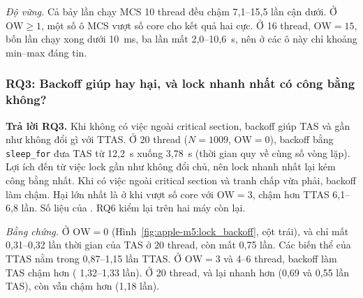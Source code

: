 \emph{Độ vững.} Cả bảy lần chạy MCS 10 thread đều chậm 7,1--15,5 lần cận dưới. Ở $\mathrm{OW} \ge 1$,
một số ô MCS vượt số core cho kết quả hai cực. Ở 16 thread, $\mathrm{OW} = 15$, bốn lần chạy xong dưới
10~ms, ba lần mất 2,0--10,6~s, nên ở các ô này chỉ khoảng min--max đáng tin.

\subsubsection{RQ3: Backoff giúp hay hại, và lock nhanh nhất có công bằng không?}

\begin{rqanswer}\textbf{Trả lời RQ3.} Khi không có việc ngoài critical section, backoff giúp TAS và gần như không
đổi gì với TTAS. Ở 20 thread
($N = 1009$, $\mathrm{OW} = 0$), backoff bằng \texttt{sleep\_for} đưa TAS từ 12,2~s xuống 3,78~s
(thời gian quy về cùng số vòng lặp). Lợi ích đến từ việc lock gần như không đổi chủ, nên lock nhanh
nhất lại kém công bằng nhất. Khi có việc ngoài critical section và tranh chấp vừa phải, backoff làm
chậm. Hại lớn nhất là ở  khi vượt số core với $\mathrm{OW} = 3$, chậm hơn TTAS
6,1--6,8 lần. Số liệu của . RQ6 kiểm lại trên hai máy còn lại.\end{rqanswer}


\emph{Bằng chứng.} Ở $\mathrm{OW} = 0$ (Hình~\ref{fig:apple-m5:lock_backoff}, cột trái),
 và  chỉ mất 0,31--0,32 lần thời gian của TAS ở 20 thread,
còn  mất 0,75 lần. Các biến thể của TTAS nằm trong 0,87--1,15 lần TTAS. Ở
$\mathrm{OW} = 3$ và 4--6 thread, backoff làm TAS chậm hơn ( 1,32--1,33 lần). Ở 20
thread,  và  lại nhanh hơn (0,69 và 0,55 lần TAS), còn
 vẫn chậm hơn (1,18 lần).



